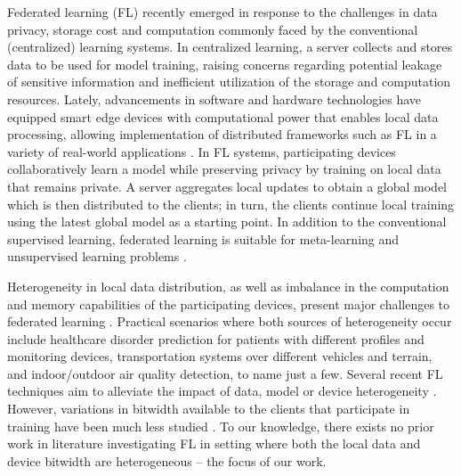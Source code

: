 Federated learning (FL) \cite{mcmahan2017communication, kairouz2021advances} recently emerged in response to the challenges in data privacy, storage cost and computation commonly faced by the conventional (centralized) learning systems. In centralized learning, a server collects and stores data to be used for model training, raising concerns regarding potential leakage of sensitive information and inefficient utilization of the storage and computation resources. Lately, advancements in software and hardware technologies have equipped smart edge devices with computational power that enables local data processing, allowing implementation of distributed frameworks such as FL in a variety of real-world applications \cite{chen2019communication}. In FL systems, participating devices collaboratively learn a model while preserving privacy by training on local data that remains private. A server aggregates local updates to obtain a global model which is then distributed to the clients; in turn, the clients continue local training using the latest global model as a starting point. In addition to the conventional supervised learning, federated learning is suitable for meta-learning and unsupervised learning problems \cite{jiang2019improving, servetnyk2020unsupervised}. 

Heterogeneity in local data distribution, as well as imbalance in the computation and memory capabilities of the participating devices, present major challenges to federated learning \cite{zhao2018federated, yoon2022bitwidth}. Practical scenarios where both sources of heterogeneity occur include healthcare disorder prediction for patients with different profiles and monitoring devices, transportation systems over different vehicles and terrain, and indoor/outdoor air quality detection, to name just a few. Several recent FL techniques aim to 
alleviate the impact of data, model or device heterogeneity \cite{jiang2020federated, lin2020ensemble, diao2020heterofl, wang2022does}. However, variations in bitwidth available to the clients that participate in training have been much
less studied \cite{yoon2022bitwidth}. To our knowledge, there exists no prior work in literature investigating FL in 
setting where both the local data and device bitwidth are heterogeneous -- the focus of our work.


